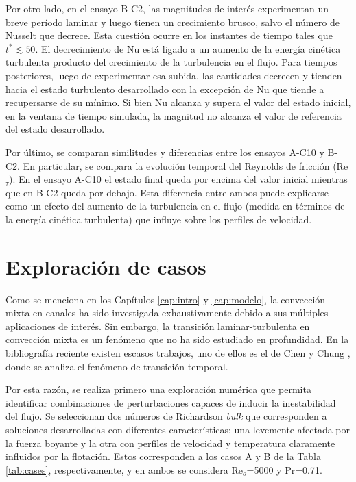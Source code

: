 Por otro lado, en el ensayo B-C2, las magnitudes de interés experimentan un breve período laminar y luego tienen un crecimiento brusco, salvo el número de Nusselt que decrece. Esta cuestión ocurre en los instantes de tiempo tales que $t^*\lesssim 50$. El decrecimiento de Nu está ligado a un aumento de la energía cinética turbulenta producto del crecimiento de la turbulencia en el flujo. Para tiempos posteriores, luego de experimentar esa subida, las cantidades decrecen y tienden hacia el estado turbulento desarrollado con la excepción de Nu que tiende a recupersarse de su mínimo. Si bien Nu alcanza y supera el valor del estado inicial, en la ventana de tiempo simulada, la magnitud no alcanza el valor de referencia del estado desarrollado. 

Por último, se comparan similitudes y diferencias entre los ensayos A-C10 y B-C2. En particular, se compara la evolución temporal del Reynolds de fricción (Re$_{\tau}$). En el ensayo \linebreak A-C10 el estado final queda por encima del valor inicial mientras que en B-C2 queda por debajo. Esta diferencia entre ambos puede explicarse como un efecto del aumento de la turbulencia en el flujo (medida en términos de la energía cinética turbulenta) que influye sobre los perfiles de velocidad.


\section{Exploración de casos} \label{sec:explo}

Como se menciona en los Capítulos \ref{cap:intro} y \ref{cap:modelo}, la convección mixta en canales ha sido investigada exhaustivamente debido a sus múltiples aplicaciones de interés. Sin embargo, la transición laminar-turbulenta en convección mixta es un fenómeno que no ha sido estudiado en profundidad. En la bibliografía reciente existen escasos trabajos, uno de ellos es el de Chen y Chung \cite{chen2003direct}, donde se analiza el fenómeno de transición temporal.

Por esta razón, se realiza primero una exploración numérica que permita identificar combinaciones de perturbaciones capaces de inducir la inestabilidad del flujo. Se seleccionan dos números de Richardson \textit{bulk} que corresponden a soluciones desarrolladas con diferentes \linebreak características: una levemente afectada por la fuerza boyante y la otra con perfiles de velocidad y temperatura claramente influidos por la flotación. Estos corresponden a los casos A y B de la Tabla \ref{tab:cases}, respectivamente, y en ambos se considera Re$_o$=5000 y Pr=0.71.

